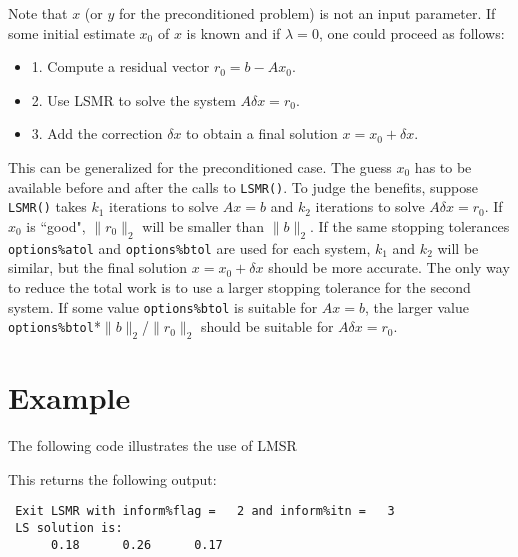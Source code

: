      Note that $x$ (or $y$ for the preconditioned problem) is not an input parameter.
     If some initial estimate $x_0$ of $x$ is known and if $\lambda = 0$,
     one could proceed as follows:
    \begin{itemize} 
     \item 1. Compute a residual vector     $r_0 = b - Ax_0$.
    \item 2. Use LSMR to solve the system  $A \delta x = r_0$.
    \item 3. Add the correction $\delta x$ to obtain a final solution $x = x_0 + \delta x$.
    \end{itemize}
     This can be generalized for the preconditioned case.
     The guess $x_0$ has to be available before and after the calls
     to {\tt LSMR()}.  To judge the benefits, suppose {\tt LSMR()} takes $k_1$ iterations
     to solve $Ax = b$ and $k_2$ iterations to solve $A \delta x = r_0$.
     If $x_0$ is ``good", $\|r_0\|_2$ will be smaller than $\|b\|_2$.
     If the same stopping tolerances {\tt options\%atol} and {\tt options\%btol}
      are used for each
     system, $k_1$ and $k_2$ will be similar, but the final solution $x = x_0 + \delta x$
     should be more accurate.  The only way to reduce the total work
     is to use a larger stopping tolerance for the second system.
     If some value {\tt options\%btol} is suitable for $Ax=b$, the larger value
     {\tt options\%btol}*$\|b\|_2$/$\|r_0\|_2$  should be suitable for $A \delta x = r_0$.
    




\section{Example}
The following code illustrates the use of LMSR



This returns the following output:

\begin{verbatim}
 Exit LSMR with inform%flag =   2 and inform%itn =   3
 LS solution is:
      0.18      0.26      0.17
\end{verbatim}

\begin{funders}
\end{funders}
